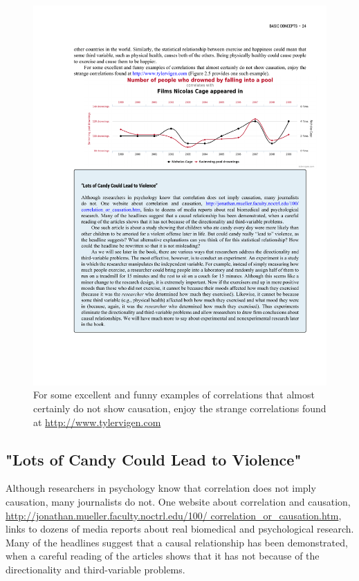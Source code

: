 \begin{figure}
      \includegraphics[width=\linewidth]{figures/C2F6NickCage.pdf}
      \caption{For some excellent and funny examples of correlations that almost certainly do not show causation, enjoy the strange correlations found at \url{http://www.tylervigen.com}}
      \label{fig:NickCage}
\end{figure}



\subsection{"Lots of Candy Could Lead to Violence"}
Although researchers in psychology know that correlation does not imply causation, many journalists do not. One website about correlation and causation, \url{http://jonathan.mueller.faculty.noctrl.edu/100/ correlation_or_causation.htm}, links to dozens of media reports about real biomedical and psychological research. Many of the headlines suggest that a causal relationship has been demonstrated, when a careful reading of the articles shows that it has not because of the directionality and third-variable problems.

